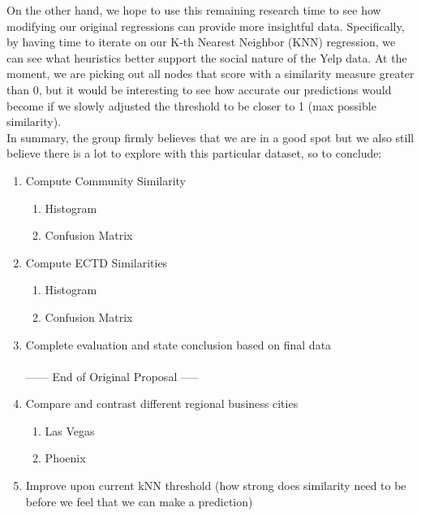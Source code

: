 \documentclass[10pt]{article}
\begin{document}
On the other hand, we hope to use this remaining research time to see how modifying our original regressions can provide more insightful data. Specifically, by having time to iterate on our K-th Nearest Neighbor (KNN) regression, we can see what heuristics better support the social nature of the Yelp data. At the moment, we are picking out all nodes that score with a similarity measure greater than 0, but it would be interesting to see how accurate our predictions would become if we slowly adjusted the threshold to be closer to 1 (max possible similarity). \\

In summary, the group firmly believes that we are in a good spot but we also still believe there is a lot to explore with this particular dataset, so to conclude:
\begin{enumerate}
\item Compute Community Similarity
\begin{enumerate}
    \item Histogram
    \item Confusion Matrix
\end{enumerate}
\item Compute ECTD Similarities
\begin{enumerate}
    \item Histogram
    \item Confusion Matrix
\end{enumerate}
\item Complete evaluation and state conclusion based on final data \\ \\
------ End of Original Proposal -----
\item Compare and contrast different regional business cities
\begin{enumerate}
    \item Las Vegas
    \item Phoenix
\end{enumerate}
\item Improve upon current kNN threshold (how strong does similarity need to be before we feel that we can make a prediction)
\end{enumerate}


\bigskip
\end{document}

